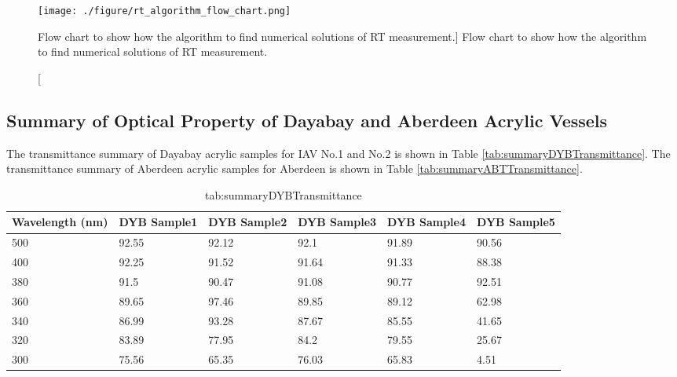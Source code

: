 \begin{figure}
    \centering
    \texttt{[image: ./figure/rt\_algorithm\_flow\_chart.png]}
    \caption
    [Flow chart to show how the algorithm to find numerical solutions of RT measurement.]
    {Flow chart to show how the algorithm to find numerical solutions of RT measurement.}
    \label{fig:rt_algorithm_flow_chart.png}
    \end{figure}



\subsection {Summary of Optical Property of Dayabay and Aberdeen Acrylic Vessels}

The transmittance summary of Dayabay acrylic samples for IAV No.1 and No.2 is shown in Table \ref{tab:summaryDYBTransmittance}.
The transmittance summary of Aberdeen acrylic samples for Aberdeen is shown in Table \ref{tab:summaryABTTransmittance}.


\begin{table}
\centering
\caption{tab:summaryDYBTransmittance}
\label{tab:}
\begin{tabular}{lp{1.5cm}p{1.5cm}p{1.5cm}p{1.5cm}p{1.5cm}}
\hline
Wavelength (nm) & DYB Sample1 & DYB Sample2 & DYB Sample3 & DYB Sample4 & DYB Sample5 \\
\hline
\hline
500 & 92.55 &  92.12 &  92.1  &  91.89 &  90.56 \\
400 & 92.25 &  91.52 &  91.64 &  91.33 &  88.38 \\
380 & 91.5  &  90.47 &  91.08 &  90.77 &  92.51 \\
360 & 89.65 &  97.46 &  89.85 &  89.12 &  62.98 \\
340 & 86.99 &  93.28 &  87.67 &  85.55 &  41.65 \\
320 & 83.89 &  77.95 &  84.2  &  79.55 &  25.67 \\
300 & 75.56 &  65.35 &  76.03 &  65.83 &  4.51  \\
\hline
\end{tabular}
\end{table}



